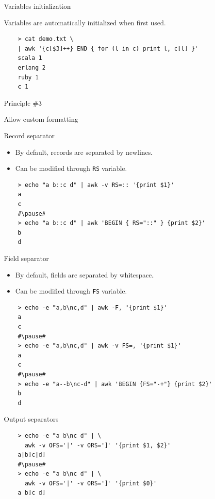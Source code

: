\documentclass{beamer}
\renewcommand\big[1]{
  \begin{center}
    \Large{#1}
  \end{center}
}
\begin{document}
\begin{frame}[fragile]
  \big{Variables initialization}

  Variables are automatically initialized when first used.

  \begin{lstlisting}
    > cat demo.txt \
    | awk '{c[$3]++} END { for (l in c) print l, c[l] }'
    scala 1
    erlang 2
    ruby 1
    c 1
  \end{lstlisting}
\end{frame}

\begin{frame}
  \centering\Huge{Principle \#3}
  \big{Allow custom formatting}
\end{frame}

\begin{frame}[fragile]
  \big{Record separator}

  \begin{itemize}
    \item By default, records are separated by newlines.
    \item Can be modified through \texttt{RS} variable.
  \end{itemize}\pause

  \begin{lstlisting}
    > echo "a b::c d" | awk -v RS=:: '{print $1}'
    a
    c
    #\pause#
    > echo "a b::c d" | awk 'BEGIN { RS="::" } {print $2}'
    b
    d
  \end{lstlisting}
\end{frame}


\begin{frame}[fragile]
  \big{Field separator}

  \begin{itemize}
    \item By default, fields are separated by whitespace.
    \item Can be modified through \texttt{FS} variable.
  \end{itemize}\pause

  \begin{lstlisting}
    > echo -e "a,b\nc,d" | awk -F, '{print $1}'
    a
    c
    #\pause#
    > echo -e "a,b\nc,d" | awk -v FS=, '{print $1}'
    a
    c
    #\pause#
    > echo -e "a--b\nc-d" | awk 'BEGIN {FS="-+"} {print $2}'
    b
    d
  \end{lstlisting}
\end{frame}

\begin{frame}[fragile]
  \big{Output separators}

  \begin{lstlisting}
    > echo -e "a b\nc d" | \
      awk -v OFS='|' -v ORS=']' '{print $1, $2}'
    a|b]c|d]
    #\pause#
    > echo -e "a b\nc d" | \
      awk -v OFS='|' -v ORS=']' '{print $0}'
    a b]c d]
  \end{lstlisting}
\end{frame}
\end{document}
